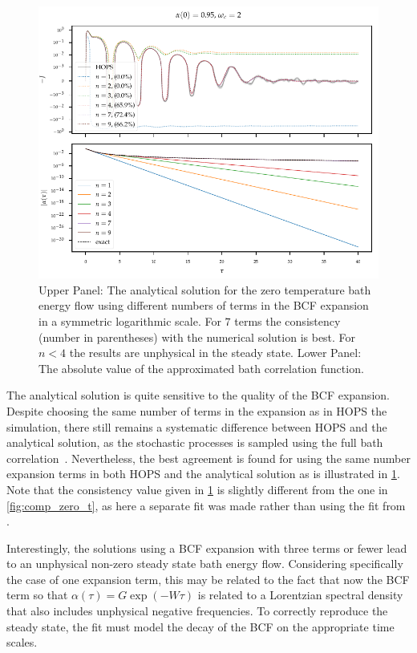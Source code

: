 \begin{figure}[htp]
  \centering
  \includegraphics{figs/analytic_comp/analytical_terms_important.pdf}
  \caption{\label{fig:analytical_terms_important} Upper Panel: The
    analytical solution for the zero temperature bath energy flow
    using different numbers of terms in the BCF expansion in a
    symmetric logarithmic scale. For \(7\) terms the consistency
    (number in parentheses) with the numerical solution is best. For
    \(n<4\) the results are unphysical in the steady state.  Lower
    Panel: The absolute value of the approximated bath correlation
    function.}
\end{figure}

The analytical solution is quite sensitive to the quality of the BCF
expansion.  Despite choosing the same number of terms in the expansion
as in HOPS the simulation, there still remains a systematic difference
between HOPS and the analytical solution, as the stochastic processes
is sampled using the full bath correlation~\cite{RichardDiss}.
Nevertheless, the best agreement is found for using the same number
expansion terms in both HOPS and the analytical solution as is
illustrated in \cref{fig:analytical_terms_important}. Note that the
consistency value given in \cref{fig:analytical_terms_important} is
slightly different from the one in \cref{fig:comp_zero_t}, as here a
separate fit was made rather than using the fit from
\cite{RichardDiss}.

Interestingly, the solutions using a BCF expansion with three terms or
fewer lead to an unphysical non-zero steady state bath energy
flow. Considering specifically the case of one expansion term, this
may be related to the fact that now the BCF term so that
\(α(τ)=G \exp(-Wτ)\) is related to a Lorentzian spectral density that
also includes unphysical negative frequencies. To correctly reproduce
the steady state, the fit must model the decay of the BCF on the
appropriate time scales.

